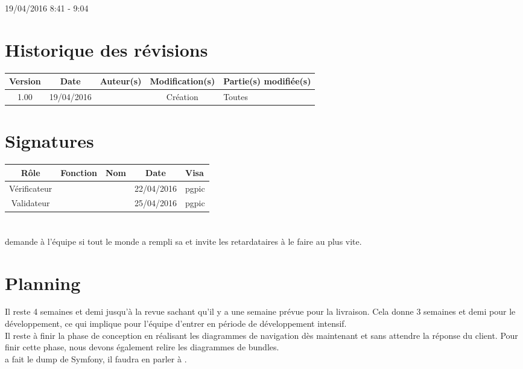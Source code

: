 \documentclass [a4paper] {article}
\begin{document}
19/04/2016			 				%
\hfill   
\hfill 	 8:41 - 9:04 				%



\section*{Historique des révisions}
\begin{center}
			\begin{tabular}{| c | c | c | c | p{4cm} |}
				\hline
				\rowcolor{Gray}
				Version & Date & Auteur(s) & Modification(s) & Partie(s) modifiée(s)		 \\
				\hline
				1.00 & 19/04/2016 & \Pierre & Création & Toutes \\
		\hline		
			\end{tabular}
		\end{center}

\section*{Signatures}

		\begin{center}
			\begin{tabular}{| c | c | c | c | p{4cm} |}
				\hline
				\rowcolor{Gray}
				Rôle & Fonction & Nom & Date & Visa		 \\
				\hline
				Vérificateur & \RQA & \Kafui & 22/04/2016 & pgpic \\[30pt]
				\hline
				Validateur & \CP & \Sergi & 25/04/2016 & pgpic \\[30pt]	
				\hline
			\end{tabular}
		\end{center}



\section{\FS}
\Sergi{} demande à l'équipe si tout le monde a rempli sa \FS{} et invite les retardataires à le faire au plus vite.


\section{Planning}
Il reste 4 semaines et demi jusqu'à la revue sachant qu'il y a une semaine prévue pour la livraison. Cela donne 3 semaines et demi pour le développement, ce qui implique pour l'équipe d'entrer en période de développement intensif. \\
Il reste à finir la phase de conception en réalisant les diagrammes de navigation dès maintenant et sans attendre la réponse du client. Pour finir cette phase, nous devons également relire les diagrammes de bundles. \\
\Kafui{} a fait le dump de Symfony, il faudra en parler à \nomTuteurPedago. \\
\end{document}

